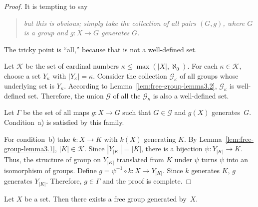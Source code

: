 \begin{proof}It is tempting to say
    \begin{quote}\small
        \textit{but this is obvious; simply take the collection of all pairs\/ $(G, g)$, where\/ $G$ is a group and\/ $g\colon X\to G$ generates\/ $G$.}
    \end{quote}
    The tricky point is ``all,'' because that is not a well-defined set.

    Let $\mathcal K$ be the set of cardinal numbers $\kappa\le\max(|X|,\aleph_0)$. For each $\kappa\in\mathcal K$, choose a set $Y_\kappa$ with $|Y_\kappa|=\kappa$. Consider the collection $\mathcal G_\kappa$ of all groups whose underlying set is $Y_\kappa$. According to Lemma~\ref{lem:free-group-lemma3.2}, $\mathcal G_\kappa$ is well-defined set. Therefore, the union $\mathcal G$ of all the $\mathcal G_\kappa$ is also a well-defined set.

    Let $\Gamma$ be the set of all maps $g\colon X\to G$ such that $G\in\mathcal G$ and $g(X)$ generates~$G$. Condition~a) is satisfied by this family.

    For condition~b) take $k\colon X\to K$ with $k(X)$ generating $K$. By Lemma~\ref{lem:free-group-lemma3.1}, $|K|\in\mathcal K$. Since $|Y_{|K|}|=|K|$, there is a bijection $\psi\colon Y_{|K|}\to K$. Thus, the structure of group on $Y_{|K|}$ translated from $K$ under $\psi$ turns $\psi$ into an isomorphism of groups. Define $g=\psi^{-1}\circ k\colon X\to Y_{|K|}$. Since $k$ generates $K$, $g$ generates $Y_{|K|}$. Therefore, $g\in\Gamma$ and the proof is complete.
\end{proof}


\begin{thm}\label{thm:free-group-existence}
    Let $X$ be a set. Then there exists a free group generated by~$X$.
\end{thm}

